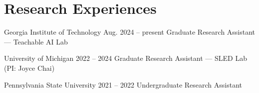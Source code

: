 \section{Research Experiences}
\CVEntry
  {Georgia Institute of Technology}
  {Aug. 2024 -- present}
  {Graduate Research Assistant --- Teachable AI Lab}
\CVGap

\CVEntry
  {University of Michigan}
  {2022 -- 2024}
  {Graduate Research Assistant --- SLED Lab (PI: Joyce Chai)}
\CVGap

\CVEntry
  {Pennsylvania State University}
  {2021 -- 2022}
  {Undergraduate Research Assistant}
\CVGap
